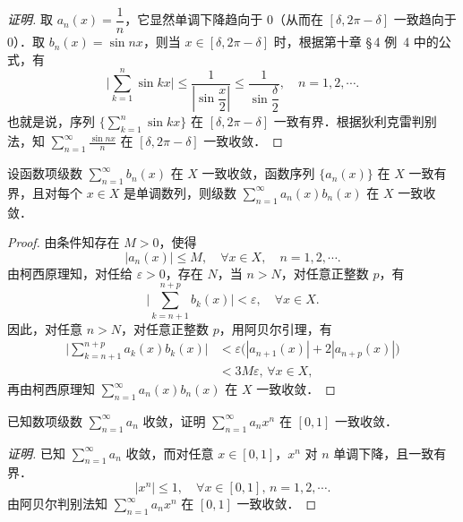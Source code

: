\begin{proof}[证明]
取 $a_{n}(x)=\dfrac{1}{n}$，它显然单调下降趋向于 $0$（从而在 $[\delta,2\pi-\delta]$ 一致趋向于 $0$）．取 $b_{n}(x)=\sin nx$，则当 $x\in[\delta,2\pi-\delta]$ 时，根据第十章 \S\,4 例~4 中的公式，有
\[
\Big|\sum_{k=1}^{n}\sin kx\Big|\leqslant\frac{1}{\left|\sin\dfrac{x}{2}\right|}\leqslant\frac{1}{\sin\dfrac{\delta}{2}},\quad n=1,2,\cdots.
\]
也就是说，序列 $\big\{\displaystyle\sum_{k=1}^{n}\sin kx\big\}$ 在 $[\delta,2\pi-\delta]$ 一致有界．根据狄利克雷判别法，知 $\displaystyle\sum_{n=1}^{\infty}\frac{\sin nx}{n}$ 在 $[\delta,2\pi-\delta]$ 一致收敛．
\end{proof}

\begin{theorem}[阿贝尔判别法]\label{thm:12-8}
设函数项级数 $\displaystyle\sum_{n=1}^{\infty}b_{n}(x)$ 在 $X$ 一致收敛，函数序列 $\{a_{n}(x)\}$ 在 $X$ 一致有界，且对每个 $x\in X$ 是单调数列，则级数 $\displaystyle\sum_{n=1}^{\infty}a_{n}(x)b_{n}(x)$ 在 $X$ 一致收敛．
\end{theorem}

\begin{proof}
由条件知存在 $M>0$，使得
\[
\left|a_{n}(x)\right|\leqslant M,\quad\forall x\in X,\quad n=1,2,\cdots.
\]
由柯西原理知，对任给 $\varepsilon>0$，存在 $N$，当 $n>N$，对任意正整数 $p$，有
\[
\Big|\sum_{k=n+1}^{n+p}b_{k}(x)\Big|<\varepsilon,\quad\forall x\in X.
\]
因此，对任意 $n>N$，对任意正整数 $p$，用阿贝尔引理，有
\[
\begin{aligned}
\Big|\sum_{k=n+1}^{n+p}a_{k}(x)b_{k}(x)\Big|&<\varepsilon\big(\left|a_{n+1}(x)\right|+2\left|a_{n+p}(x)\right|\big)\\
&<3M\varepsilon,\,\forall x\in X,
\end{aligned}
\]
再由柯西原理知 $\displaystyle\sum_{n=1}^{\infty}a_{n}(x)b_{n}(x)$ 在 $X$ 一致收敛．
\end{proof}

\begin{example}\label{ex:12-2-11}
已知数项级数 $\displaystyle\sum_{n=1}^{\infty}a_{n}$ 收敛，证明 $\displaystyle\sum_{n=1}^{\infty}a_{n}x^{n}$ 在 $[0,1]$ 一致收敛．
\end{example}

\begin{proof}[证明]
已知 $\displaystyle\sum_{n=1}^{\infty}a_{n}$ 收敛，而对任意 $x\in[0,1]$，$x^{n}$ 对 $n$ 单调下降，且一致有界．
\[
\left|x^{n}\right|\leqslant 1,\quad\forall x\in[0,1],\,n=1,2,\cdots.
\]
由阿贝尔判别法知 $\displaystyle\sum_{n=1}^{\infty}a_{n}x^{n}$ 在 $[0,1]$ 一致收敛．
\end{proof}

